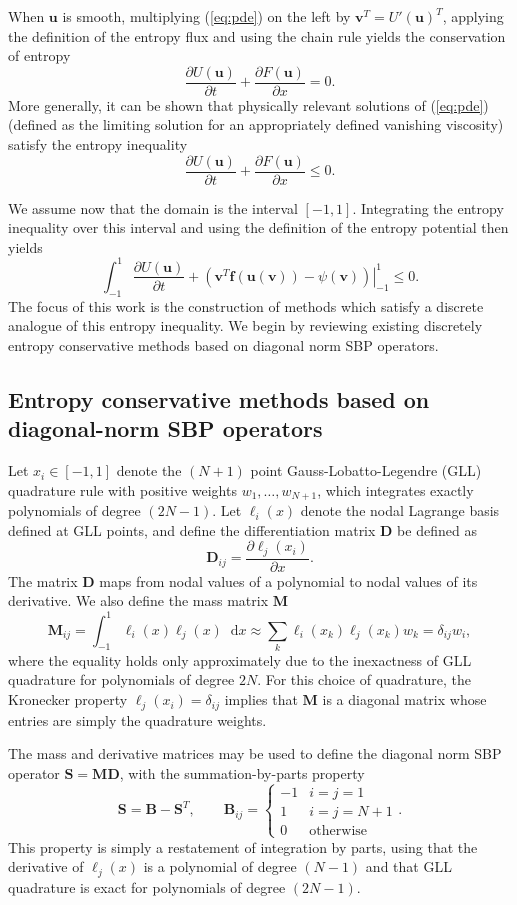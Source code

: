 \documentclass[preprint,10pt]{elsarticle}
\theoremstyle{definition}
\theoremstyle{lemma}
\theoremstyle{theorem}
\theoremstyle{assumption}
\newcommand{\pd}[2]{\frac{\partial#1}{\partial#2}}
\newcommand{\LRp}[1]{\left( #1 \right)}
\newcommand*\diff[1]{\mathop{}\!{\mathrm{d}#1}}
\begin{document}
When $\bm{u}$ is smooth, multiplying (\ref{eq:pde}) on the left by $\bm{v}^T = U'(\bm{u})^T$, applying the definition of the entropy flux and using the chain rule yields the conservation of entropy
\[
\pd{U(\bm{u})}{t} + \pd{F(\bm{u})}{{x}} = 0.
\]
More generally, it can be shown that physically relevant solutions of (\ref{eq:pde}) (defined as the limiting solution for an appropriately defined vanishing viscosity) satisfy the entropy inequality
\[
\pd{U(\bm{u})}{t} + \pd{F(\bm{u})}{{x}} \leq 0.  
\]

We assume now that the domain is the interval $[-1,1]$.  Integrating the entropy inequality over this interval and using the definition of the entropy potential then yields
\begin{equation}
\int_{-1}^1 \pd{U(\bm{u})}{t} + \left.\LRp{\bm{v}^T\bm{f}(\bm{u}(\bm{v}))-\psi(\bm{v})}\right|_{-1}^1 \leq 0.  
\label{eq:consentropy}
\end{equation}
The focus of this work is the construction of methods which satisfy a discrete analogue of this entropy inequality.  We begin by reviewing existing discretely entropy conservative methods based on diagonal norm SBP operators. 

\subsection{Entropy conservative methods based on diagonal-norm SBP operators}

Let ${x}_i \in [-1,1]$ denote the $(N+1)$ point Gauss-Lobatto-Legendre (GLL) quadrature rule with positive weights $w_1,\ldots,w_{N+1}$, which integrates exactly polynomials of degree $(2N-1)$.  Let $\ell_i(x)$ denote the nodal Lagrange basis defined at GLL points, and define the differentiation matrix $\bm{D}$ be defined as 
\[
\bm{D}_{ij} = \pd{\ell_j(x_i)}{x}.
\]
The matrix $\bm{D}$ maps from nodal values of a polynomial to nodal values of its derivative.  We also define the mass matrix $\bm{M}$
\[
\bm{M}_{ij} = \int_{-1}^1 \ell_i(x)\ell_j(x)\diff{x} \approx \sum_{k} \ell_i(x_k)\ell_j(x_k) w_k = \delta_{ij} w_i,
\]
where the equality holds only approximately due to the inexactness of GLL quadrature for polynomials of degree $2N$.  For this choice of quadrature, the Kronecker property $\ell_j(x_i) = \delta_{ij}$ implies that $\bm{M}$ is a diagonal matrix whose entries are simply the quadrature weights.  

The mass and derivative matrices may be used to define the diagonal norm SBP operator $\bm{S} = \bm{M}\bm{D}$, with the summation-by-parts property 
\[
\bm{S} = \bm{B} - \bm{S}^T, \qquad \bm{B}_{ij} = \begin{cases}
-1 &i = j = 1 \\
1 &i = j = N+1 \\
0 &\text{otherwise}
\end{cases}.
\]
This property is simply a restatement of integration by parts, using that the derivative of $\ell_j(x)$ is a polynomial of degree $(N-1)$ and that GLL quadrature is exact for polynomials of degree $(2N-1)$.  
\end{document}
